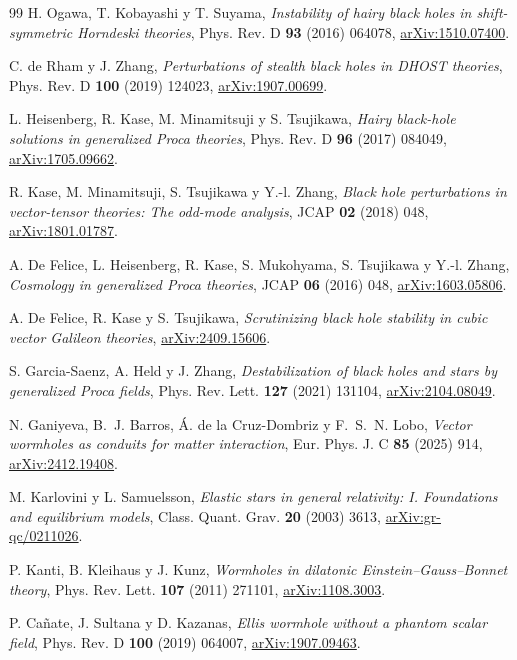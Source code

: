 \documentclass[11pt,a4paper]{article}
\theoremstyle{remark}
\begin{document}
\begin{thebibliography}{99}
 H. Ogawa, T. Kobayashi y T. Suyama, \emph{Instability of hairy black holes in shift-symmetric Horndeski theories}, Phys. Rev. D \textbf{93} (2016) 064078, \href{https://arxiv.org/abs/1510.07400}{arXiv:1510.07400}.

 C. de Rham y J. Zhang, \emph{Perturbations of stealth black holes in DHOST theories}, Phys. Rev. D \textbf{100} (2019) 124023, \href{https://arxiv.org/abs/1907.00699}{arXiv:1907.00699}.

 L. Heisenberg, R. Kase, M. Minamitsuji y S. Tsujikawa, \emph{Hairy black-hole solutions in generalized Proca theories}, Phys. Rev. D \textbf{96} (2017) 084049, \href{https://arxiv.org/abs/1705.09662}{arXiv:1705.09662}.

 R. Kase, M. Minamitsuji, S. Tsujikawa y Y.-l. Zhang, \emph{Black hole perturbations in vector-tensor theories: The odd-mode analysis}, JCAP \textbf{02} (2018) 048, \href{https://arxiv.org/abs/1801.01787}{arXiv:1801.01787}.

 A. De Felice, L. Heisenberg, R. Kase, S. Mukohyama, S. Tsujikawa y Y.-l. Zhang, \emph{Cosmology in generalized Proca theories}, JCAP \textbf{06} (2016) 048, \href{https://arxiv.org/abs/1603.05806}{arXiv:1603.05806}.

 A. De Felice, R. Kase y S. Tsujikawa, \emph{Scrutinizing black hole stability in cubic vector Galileon theories}, \href{https://arxiv.org/abs/2409.15606}{arXiv:2409.15606}.

 S. Garcia-Saenz, A. Held y J. Zhang, \emph{Destabilization of black holes and stars by generalized Proca fields}, Phys. Rev. Lett. \textbf{127} (2021) 131104, \href{https://arxiv.org/abs/2104.08049}{arXiv:2104.08049}.

 N. Ganiyeva, B.~J. Barros, Á. de la Cruz-Dombriz y F.~S.~N. Lobo, \emph{Vector wormholes as conduits for matter interaction}, Eur. Phys. J. C \textbf{85} (2025) 914, \href{https://arxiv.org/abs/2412.19408}{arXiv:2412.19408}.

 M. Karlovini y L. Samuelsson, \emph{Elastic stars in general relativity: I. Foundations and equilibrium models}, Class. Quant. Grav. \textbf{20} (2003) 3613, \href{https://arxiv.org/abs/gr-qc/0211026}{arXiv:gr-qc/0211026}.

 P. Kanti, B. Kleihaus y J. Kunz, \emph{Wormholes in dilatonic Einstein--Gauss--Bonnet theory}, Phys. Rev. Lett. \textbf{107} (2011) 271101, \href{https://arxiv.org/abs/1108.3003}{arXiv:1108.3003}.

 P. Cañate, J. Sultana y D. Kazanas, \emph{Ellis wormhole without a phantom scalar field}, Phys. Rev. D \textbf{100} (2019) 064007, \href{https://arxiv.org/abs/1907.09463}{arXiv:1907.09463}.

\end{thebibliography}
\end{document}
